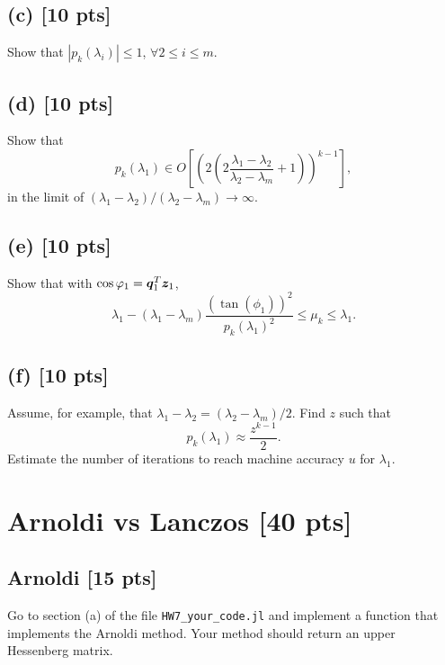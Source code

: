 \documentclass[twoside,10pt]{article}
\begin{document}
\subsection*{(c) [10 pts]}
Show that $|p_k(\lambda_i)| \leq 1$, $\forall 2 \leq i \leq m$. 

\subsection*{(d) [10 pts]}
Show that
\begin{equation}
  p_k(\lambda_1) \in O\left[ \left(2 \left(2 \frac{\lambda_1 - \lambda_2}{\lambda_2 - \lambda_m} + 1\right)\right)^{k - 1} \right],
\end{equation}
in the limit of $(\lambda_{1} - \lambda_{2}) / (\lambda_{2} - \lambda_{m}) \rightarrow \infty$. 

\subsection*{(e) [10 pts]}
Show that with $\cos{\varphi_1} = \bm{q}_1^T \bm{z}_1$, 
\begin{equation}
  \lambda_{1} - (\lambda_{1} - \lambda_{m}) \frac{(\tan (\phi_1))^2}{p_{k}(\lambda_1)^2} \leq \mu_{k} \leq \lambda_1.
\end{equation}

\subsection*{(f) [10 pts]}

Assume, for example, that $\lambda_1 - \lambda_2 = (\lambda_2 - \lambda_m) / 2.$  
Find $z$ such that 
\begin{equation}
  p_k (\lambda_1) \approx \frac{z^{k - 1}}{2}.
\end{equation}
Estimate the number of iterations to reach machine accuracy $u$ for $\lambda_1$. 

\section{Arnoldi vs Lanczos [40 pts]}
\subsection*{Arnoldi [15 pts]} 
Go to section (a) of the file \texttt{HW7\_your\_code.jl} and implement a function that implements the Arnoldi method. 
Your method should return an upper Hessenberg matrix. 
\end{document}
